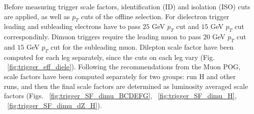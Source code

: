 \begin{table}[b]
\caption{Triggers for dimuon and dielectron analysis channels both at L1 and HLT levels.}

\label{tab:trgs2015}
\begin{center}

\end{center}
\end{table}

Before measuring trigger scale factors, identification (ID) and isolation (ISO) cuts are applied, as well as $p_{T}$ cuts of the offline selection. For dielectron trigger leading and subleading electrons have to pass $25$ GeV $p_{T}$ cut and $15$ GeV $p_{T}$ cut correspondinly. Dimuon triggers require the leading muon to pass $20$ GeV $p_{T}$ cut and $15$ GeV $p_{T}$ cut for the subleading muon. 
Dilepton scale factor have been computed for each leg separately, since the cuts on each leg vary (Fig. ~\ref{fig:trigger_eff_diele}). Following the recommendations from the Muon POG, scale factors have been computed separately for two groups: run H and other runs, and then the final scale factors are determined as luminosity averaged scale factors (Figs. ~\ref{fig:trigger_SF_dimu_BCDEFG}, ~\ref{fig:trigger_SF_dimu_H}, ~\ref{fig:trigger_SF_dimu_dZ_H}). 

